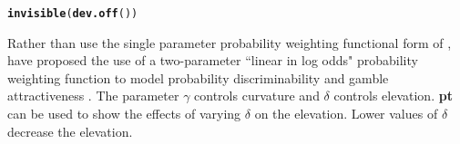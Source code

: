 \documentclass{article}\usepackage[]{graphicx}\usepackage[]{color}
\makeatletter
\newcommand{\hlstd}[1]{\textcolor[rgb]{0.345,0.345,0.345}{#1}}%
\newcommand{\hlkwd}[1]{\textcolor[rgb]{0.737,0.353,0.396}{\textbf{#1}}}%
\newenvironment{kframe}{%
 \def\at@end@of@kframe{}%
 \ifinner\ifhmode%
  \def\at@end@of@kframe{\end{minipage}}%
  \begin{minipage}{\columnwidth}%
 \fi\fi%
 \def\FrameCommand##1{\hskip\@totalleftmargin \hskip-\fboxsep
 \colorbox{shadecolor}{##1}\hskip-\fboxsep
     \hskip-\linewidth \hskip-\@totalleftmargin \hskip\columnwidth}%
 \MakeFramed {\advance\hsize-\width
   \@totalleftmargin\z@ \linewidth\hsize
   \@setminipage}}%
 {\par\unskip\endMakeFramed%
 \at@end@of@kframe}
\newenvironment{knitrout}{}{} %
\makeatother
\begin{document}
\begin{knitrout}
{}


\begin{kframe}\begin{alltt}
\hlkwd{invisible}\hlstd{(}\hlkwd{dev.off}\hlstd{())}
\end{alltt}
\end{kframe}
\end{knitrout}


Rather than use the single parameter probability weighting functional form of \cite{Tversky_Kahneman_1992}, \cite{Gonzalez_Wu_1999} have proposed the use of
a two-parameter ``linear in log odds" probability weighting function to model probability discriminability and gamble attractiveness \cite[Figure 4 p. 140]{Gonzalez_Wu_1999}. The parameter $\gamma$ controls curvature and $\delta$ controls elevation. {\bf pt} can be used to show the effects of varying $\delta$ on the elevation. Lower values of $\delta$ decrease the elevation.
\end{document}
